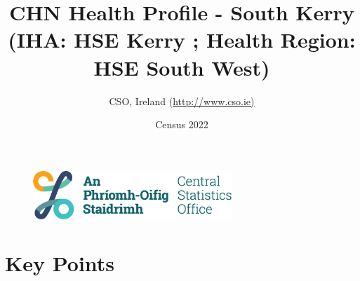 \documentclass{article}
\title{CHN Health Profile - South Kerry (IHA: HSE Kerry ;  Health Region: HSE South West) }
\date{Census 2022}
\author{CSO, Ireland  (\url{http://www.cso.ie)}}
\begin{document}


\begin{figure}
	\centering
\includegraphics[width =75mm]{../figures/CSO_Logo.png}
\end{figure}

				 
		   
						  
														  
																																													
												 
			 
\maketitle
					
													   
				 
						 
																																																																											   
				 
				  
  \pagebreak
    	    \tableofcontents

\pagebreak


\section{Key Points}
\end{document}
